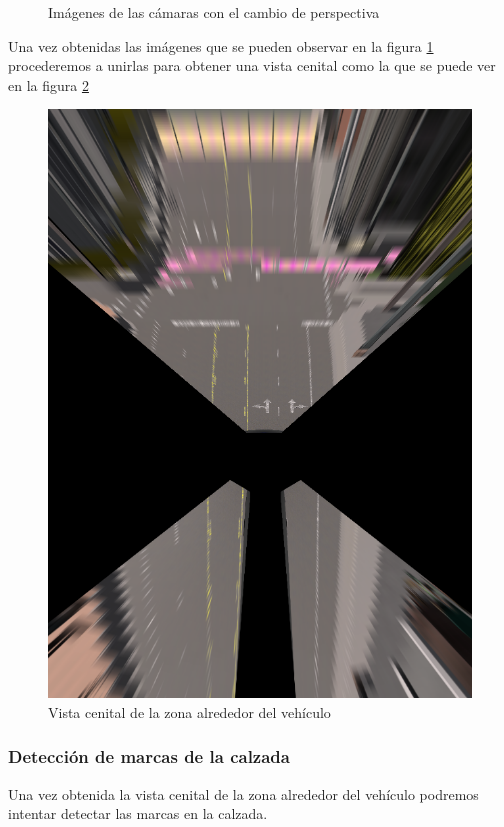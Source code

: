 \begin{figure}[h!]
    \caption{Imágenes de las cámaras con el cambio de perspectiva}
    \label{fig:wapimg}
\end{figure}

Una vez obtenidas las imágenes que se pueden observar en la figura \ref{fig:wapimg} procederemos a unirlas para obtener una vista cenital como la que se puede ver en la figura \ref{fig:persWarp}
\begin{figure}[h!]
    \centering
    \includegraphics[width=.9\linewidth]{img/persWarpRGB.png}
    \caption{Vista cenital de la zona alrededor del vehículo}
    \label{fig:persWarp}
\end{figure}










\subsubsection{Detección de marcas de la calzada}
Una vez obtenida la vista cenital de la zona alrededor del vehículo podremos intentar detectar las marcas en la calzada.

